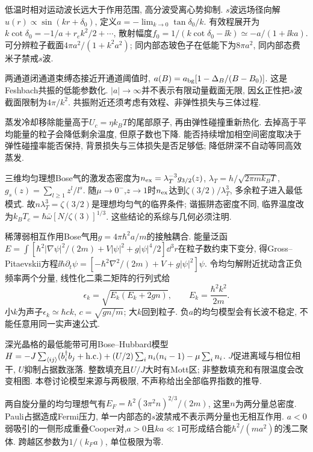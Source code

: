 低温时相对运动波长远大于作用范围, 高分波受离心势抑制. $s$波远场径向解$u(r)\propto\sin(kr+\delta_0)$, 定义$a=-\lim_{k\to0}\tan\delta_0/k$. 有效程展开为$k\cot\delta_0=-1/a+r_ek^2/2+\cdots$, 散射幅度$f_0=1/(k\cot\delta_0-\ii k)\simeq-a/(1+\ii ka)$. 可分辨粒子截面$4\pi a^2/(1+k^2a^2)$; 同内部态玻色子在低能下为$8\pi a^2$, 同内部态费米子禁戒$s$波.

两通道闭通道束缚态接近开通道阈值时, $a(B)=a_{\rm bg}[1-\Delta_B/(B-B_0)]$. 这是Feshbach共振的低能参数化. $|a|\to\infty$并不表示有限动量截面无限, 因幺正性把$s$波截面限制为$4\pi/k^2$. 共振附近还须考虑有效程、非弹性损失与三体过程.

蒸发冷却移除能量高于$U_c=\eta k_BT$的尾部原子, 再由弹性碰撞重新热化. 去掉高于平均能量的粒子会降低剩余温度, 但原子数也下降. 能否持续增加相空间密度取决于弹性碰撞率能否保持, 背景损失与三体损失是否足够低; 降低阱深不自动等同高效蒸发.

三维均匀理想Bose气的激发态密度为$n_{\rm ex}=\lambda_T^{-3}g_{3/2}(z)$, $\lambda_T=h/\sqrt{2\pi mk_BT}$,$g_s(z)=\sum_{l\ge1}z^l/l^s$. 随$\mu\to0^-$,$z\to1$时$n_{\rm ex}$达到$\zeta(3/2)/\lambda_T^3$, 多余粒子进入最低模式. 故$n\lambda_T^3=\zeta(3/2)$是理想均匀气的临界条件; 谐振阱态密度不同, 临界温度改为$k_BT_c=\hbar\bar\omega[N/\zeta(3)]^{1/3}$. 这些结论的系综与几何必须注明.

稀薄弱相互作用Bose气用$g=4\pi\hbar^2a/m$的接触耦合. 能量泛函$E=\int[\hbar^2|\nabla\psi|^2/(2m)+V|\psi|^2+g|\psi|^4/2]\dd^3r$在粒子数约束下变分, 得Gross--Pitaevskii方程$\ii\hbar\partial_t\psi=[-\hbar^2\nabla^2/(2m)+V+g|\psi|^2]\psi$. 令均匀解附近扰动含正负频率两个分量, 线性化二乘二矩阵的行列式给
\[\epsilon_k=\sqrt{E_k(E_k+2gn)},\qquad E_k=\frac{\hbar^2k^2}{2m}.\]
小$k$为声子$\epsilon_k\simeq\hbar ck$, $c=\sqrt{gn/m}$; 大$k$回到粒子. 负$a$的均匀模型会有长波不稳定, 不能任意用同一实声速公式.

深光晶格的最低能带可用Bose--Hubbard模型$H=-J\sum_{\langle ij\rangle}(b_i^\dagger b_j+\mathrm{h.c.})+(U/2)\sum_i n_i(n_i-1)-\mu\sum_in_i$. $J$促进离域与相位相干, $U$抑制占据数涨落. 整数填充且$U/J$大时有Mott区; 非整数填充和有限温度会改变相图. 本卷讨论模型来源与两极限, 不声称给出全部临界指数的推导.

两自旋分量的均匀理想气有$E_F=\hbar^2(3\pi^2n)^{2/3}/(2m)$, 这里$n$为两分量总密度. Pauli占据造成Fermi压力, 单一内部态的$s$波禁戒不表示两分量也无相互作用. $a<0$弱吸引的一侧形成重叠Cooper对,$a>0$且$ka\ll1$可形成结合能$\hbar^2/(ma^2)$的浅二聚体. 跨越区参数为$1/(k_Fa)$, 单位极限为零.

